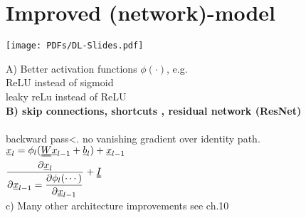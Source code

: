 \section{Improved (network)-model}
\texttt{[image: PDFs/DL-Slides.pdf]}

A) Better activation functions $  \phi(\cdot) $, e.g. \\
\textbullet ReLU instead of sigmoid \\
\textbullet leaky reLu instead of ReLU\\
\textbf{B) skip connections, shortcuts , residual network (ResNet)}\\
 \\
\textbullet backward pass<. no vanishing gradient over identity path. \\
$  \x_l = \phi_l (\W \x_{l-1} + \b_l )  + \x_{l-1}$\\
$ \dfrac{\partial \x_l}{\partial \x_{l-1} = \dfrac{\partial \phi _l (\cdots)}{\partial \x_{l-1}}} + \II  $\\
c) Many other architecture improvements see ch.10 




 

























